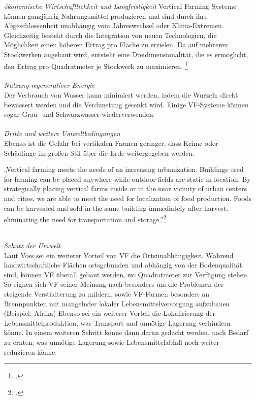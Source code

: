 \documentclass{scrartcl}
\begin{document}
\textit{ökonomische Wirtschaftlichkeit und Langfristigkeit}
Vertical Farming Systeme können ganzjährig Nahrungsmittel produzieren und sind durch ihre Abgeschlossenheit unabhängig vom Jahreswechsel oder Klima-Extremen. Gleichzeitig besteht durch die Integration von neuen Technologien, die Möglichkeit einen höheren Ertrag pro Fläche zu erzielen. Da auf mehreren Stockwerken angebaut wird, entsteht eine Dreidimensionalität, die es ermöglicht, den Ertrag pro Quadratmeter je Stockwerk zu maximieren. \footcite{Despommier2010TheCentury.} \\
\\
\textit{Nutzung regenerativer Energie}\\
Der Verbrauch von Wasser kann minimiert werden, indem die Wurzeln direkt bewässert werden und die Verdunstung gesenkt wird. Einige VF-Systeme können sogar Grau- und Schwarzwasser wiederverwenden. \\
\\
\textit{Dritte und weitere Umweltbedingungen}\\
Ebenso ist die Gefahr bei vertikalen Farmen geringer, dass Keime oder Schädlinge im großen Stil über die Erde weitergegeben werden.\\
\begin{displayquote}
„Vertical farming meets the needs of an increasing urbanization. Buildings used for farming can be placed anywhere while outdoor fields are static in location. By strategically placing vertical farms inside or in the near vicinity of urban centers and cities, we are able to meet the need for localization of food production. Foods can be harvested and sold in the same building immediately after harvest, eliminating the need for transportation and storage.”\footcite[S.7]{PeterMollerVoss2013VerticalRise}
\end{displayquote}
\\
\textit{Schutz der Umwelt}\\
Laut Voss sei ein weiterer Vorteil von VF die Ortsunabhängigkeit. Während landwirtschaftliche Flächen ortsgebunden und abhängig von der Bodenqualität sind, können VF überall gebaut werden, wo Quadratmeter zur Verfügung stehen. So eignen sich VF seiner Meinung nach besonders um die Problemen der steigende Verstädterung zu mildern, sowie VF-Farmen besonders an Brennpunkten mit mangelnder lokaler Lebensmittelversorgung aufzubauen (Beispiel: Afrika)
Ebenso sei ein weiterer Vorteil die Lokalisierung der Lebensmittelproduktion, was Transport und unnötige Lagerung verhindern könne. In einem weiteren Schritt könne dann daran gedacht werden, nach Bedarf zu ernten, was unnötige Lagerung sowie Lebensmittelabfall noch weiter reduzieren könne.\\
\end{document}
